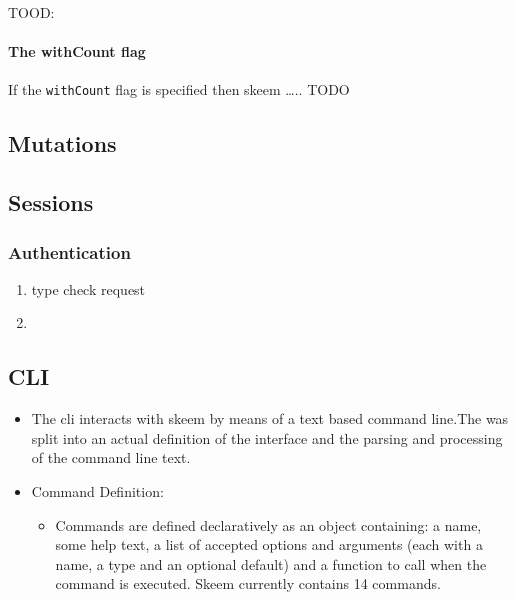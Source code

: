 \documentclass[
  12pt,
]{article}
\newcommand{\passthrough}[1]{#1}
\providecommand{\tightlist}{%
  \setlength{\itemsep}{0pt}\setlength{\parskip}{0pt}}
\let\oldparagraph\paragraph
\renewcommand{\paragraph}[1]{\oldparagraph{#1}\mbox{}}
\begin{document}
TOOD:

\hypertarget{the-withcount-flag}{%
\paragraph{The withCount flag}\label{the-withcount-flag}}

If the \passthrough{\lstinline!withCount!} flag is specified then skeem
\ldots.. TODO

\hypertarget{mutations}{%
\subsection{Mutations}\label{mutations}}

\hypertarget{sessions}{%
\subsection{Sessions}\label{sessions}}

\hypertarget{authentication-2}{%
\subsubsection{Authentication}\label{authentication-2}}

\begin{enumerate}
\def\labelenumi{\arabic{enumi}.}
\item
  type check request
\item
\end{enumerate}

\hypertarget{cli-1}{%
\subsection{CLI}\label{cli-1}}

\begin{itemize}
\tightlist
\item
  The cli interacts with skeem by means of a text based command line.The
  was split into an actual definition of the interface and the parsing
  and processing of the command line text.
\item
  Command Definition:

  \begin{itemize}
  \tightlist
  \item
    Commands are defined declaratively as an object containing: a name,
    some help text, a list of accepted options and arguments (each with
    a name, a type and an optional default) and a function to call when
    the command is executed. Skeem currently contains 14 commands.
  \end{itemize}
\end{itemize}
\end{document}

